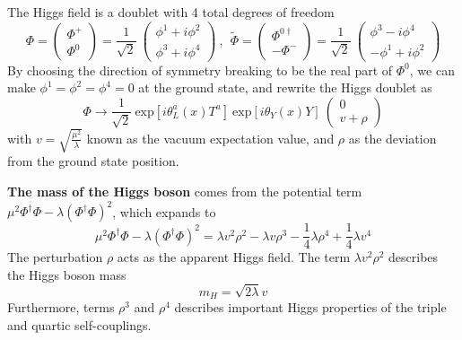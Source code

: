 The Higgs field is a doublet with 4 total degrees of freedom
\begin{equation}\label{eq:SU2_higgs}
    \Phi = \begin{pmatrix} \Phi^{+} \\ \Phi^{0} \end{pmatrix} 
         = \frac{1}{\sqrt{2}} ~ \begin{pmatrix} \phi^{1}+i\phi^{2} \\ \phi^{3}+i\phi^{4} \end{pmatrix}
    ~,~~
    \tilde{\Phi} = \begin{pmatrix} \Phi^{0\dagger} \\ -\Phi^{-} \end{pmatrix} 
                 = \frac{1}{\sqrt{2}} ~ \begin{pmatrix} \phi^{3}-i\phi^{4} \\ -\phi^{1}+i\phi^{2} \end{pmatrix}     
\end{equation}
By choosing the direction of symmetry breaking to be the real part of $\Phi^{0}$, 
we can make $\phi^{1} = \phi^{2} = \phi^{4} = 0$ at the ground state,
and rewrite the Higgs doublet as
\begin{equation}\label{eq:Higgs_ground}
    \Phi \to \frac{1}{\sqrt{2}} ~\text{exp}[i\theta^{a}_{L}(x)T^{a}] ~\text{exp}[i\theta_{Y}(x)Y] ~\begin{pmatrix} 0 \\ v + \rho \end{pmatrix}
\end{equation} 
with $v = \sqrt{\frac{\mu^{2}}{\lambda}}$ known as the vacuum expectation value,
and $\rho$ as the deviation from the ground state position.


\textbf{The mass of the Higgs boson} comes from the potential term $\mu^{2} \Phi^{\dagger}\Phi - \lambda (\Phi^{\dagger}\Phi)^{2}$,
which expands to 
\begin{equation}\label{eq:potential_expand}
  \mu^{2} \Phi^{\dagger}\Phi - \lambda (\Phi^{\dagger}\Phi)^{2}
  = \lambda v^{2} \rho^{2} - \lambda v \rho^{3} - \frac{1}{4} \lambda \rho^{4} + \frac{1}{4} \lambda v^{4}
\end{equation}
The perturbation $\rho$ acts as the apparent Higgs field.
The term $\lambda v^{2} \rho^{2}$ describes the Higgs boson mass
\begin{equation}\label{eq:Higgs_mass}
    m_{H} = \sqrt{2\lambda} v
\end{equation}
Furthermore, terms $\rho^{3}$ and $\rho^{4}$ describes important Higgs properties of the triple and quartic self-couplings.

